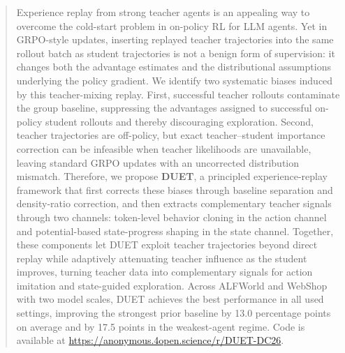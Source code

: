 %

\begin{abstract}
Experience replay from strong teacher agents is an appealing way to overcome the cold-start problem in on-policy RL for LLM agents. Yet in GRPO-style updates, inserting replayed teacher trajectories into the same rollout batch as student trajectories is not a benign form of supervision: it changes both the advantage estimates and the distributional assumptions underlying the policy gradient. We identify two systematic biases induced by this teacher-mixing replay. First, successful teacher rollouts contaminate the group baseline, suppressing the advantages assigned to successful on-policy student rollouts and thereby discouraging exploration. Second, teacher trajectories are off-policy, but exact teacher--student importance correction can be infeasible when teacher likelihoods are unavailable, leaving standard GRPO updates with an uncorrected distribution mismatch. Therefore, we propose \textbf{DUET}, a principled experience-replay framework that first corrects these biases through baseline separation and density-ratio correction, and then extracts complementary teacher signals through two channels: token-level behavior cloning in the action channel and potential-based state-progress shaping in the state channel. Together, these components let DUET exploit teacher trajectories beyond direct replay while adaptively attenuating teacher influence as the student improves, turning teacher data into complementary signals for action imitation and state-guided exploration. Across ALFWorld and WebShop with two model scales, DUET achieves the best performance in all used settings, improving the strongest prior baseline by 13.0 percentage points on average and by 17.5 points in the weakest-agent regime. Code is available at \url{https://anonymous.4open.science/r/DUET-DC26}.
\end{abstract}